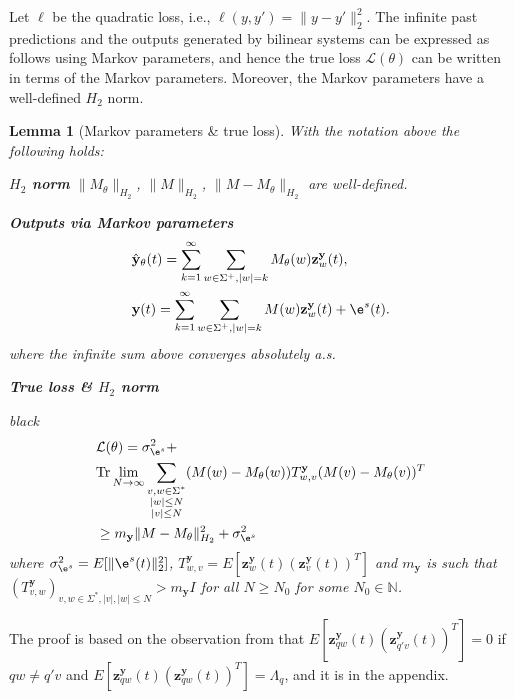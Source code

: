 \documentclass{ifacconf}
\def\eqref#1{(\ref{#1})}
\def\rvy{{\mathbf{y}}}
\def\rvz{{\mathbf{z}}}
\newtheorem{lemma}{Lemma}[section]
\begin{document}
Let $\ell$ be the quadratic loss, i.e., $\ell(y,y')=\|y-y'\|^2_2$. %
The infinite past predictions and the outputs generated by bilinear systems
can be expressed as follows using Markov parameters, and hence the true loss $\mathcal{L}(\theta)$ can be written in terms of the Markov parameters. Moreover, the Markov parameters have a well-defined $H_2$ norm. 
\begin{lemma}[Markov parameters \& true loss]
  \label{lemma:bilinear:markov1}
With the notation above  the following holds:

\textbf{$H_2$ norm} $\|M_{\theta}\|_{H_2}$, $\|M\|_{H_2}$, $\|M-M_{\theta}\|_{H_2}$ are well-defined.

\textbf{Outputs via Markov parameters}
\[ 
  \begin{split}
   & \hat{\rvy}_{\theta}(t)=\sum_{k=1}^{\infty} \sum_{w \in \Sigma^{+},|w|=k}
   M_{\theta}(w) \rvz^{\rvy}_{w}(t), \\
   & \rvy(t)=\sum_{k=1}^{\infty} \sum_{w \in \Sigma^{+},|w|=k}
   M(w) \rvz^{\rvy}_{w}(t) + \e^s(t).
  \end{split}
\]
where the infinite sum  above converges absolutely a.s.

\textbf{True loss \& $H_2$ norm}
\begin{color}{black}
\begin{equation}
\label{bil:pred_error_1}
\begin{aligned}
 & \mathcal{L}(\theta)=\sigma^{2}_{\e^s} 
+  \\
& \mathrm{Tr} \lim_{N \rightarrow \infty} \sum_{\substack{v,w \in \Sigma^{*} \\ |w| \le N \\ |v|\le N}}
 (M(w)-M_{\theta}(w))T_{w,v}^{\rvy}(M(v)-M_{\theta}(v))^T  \\
 & \ge m_{\rvy} \|M-M_{\theta}\|_{H_2}^2 + \sigma^2_{\e^s}
\end{aligned}
\end{equation}
where $\sigma^{2}_{\e^s}=E[\|\e^s(t)\|^2_2]$, $T_{w,v}^{\rvy}=E[\rvz^{\rvy}_{w}(t)(\rvz^{\rvy}_{v}(t))^T]$ and $m_{\rvy}$ is such that $(T_{v,w}^{\rvy})_{v,w \in \Sigma^{*}, |v|,|w| \le N} > m_{\rvy}I$ for all $N \ge N_0$  for some $N_0 \in \mathbb{N}$. 
\end{color}
\end{lemma}
The proof is based on the observation from \cite{TAC:MPRV} that $E[\rvz_{qw}^{\rvy}(t)(\rvz_{q'v}^{\rvy}(t))^T]=0$ if $qw \ne q'v$ and $E[\rvz_{qw}^{\rvy}(t)(\rvz_{qw}^{\rvy}(t))^T]=\Lambda_q$, and it is in the appendix.%
\end{document}
